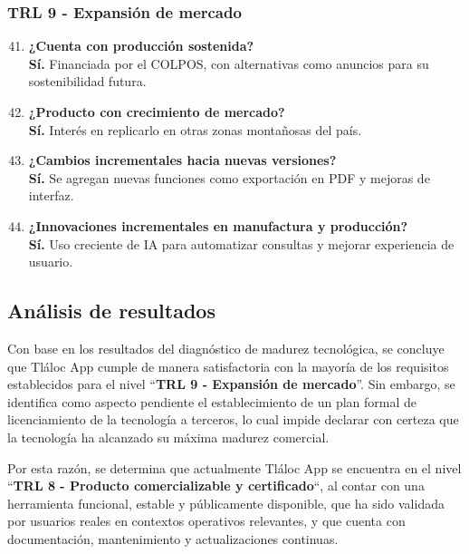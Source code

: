 \subsubsection*{TRL 9 - Expansión de mercado}
\begin{enumerate}
    \setcounter{enumi}{40}
    \item \textbf{¿Cuenta con producción sostenida?} \\ \textbf{Sí.} Financiada por el COLPOS, con alternativas como anuncios para su sostenibilidad futura.
    
    \item \textbf{¿Producto con crecimiento de mercado?} \\ \textbf{Sí.} Interés en replicarlo en otras zonas montañosas del país.
    
    \item \textbf{¿Cambios incrementales hacia nuevas versiones?} \\ \textbf{Sí.} Se agregan nuevas funciones como exportación en PDF y mejoras de interfaz.
    
    \item \textbf{¿Innovaciones incrementales en manufactura y producción?} \\ \textbf{Sí.} Uso creciente de IA para automatizar consultas y mejorar experiencia de usuario.
\end{enumerate}

\subsection{Análisis de resultados}

Con base en los resultados del diagnóstico de madurez tecnológica, se concluye que Tláloc App cumple de manera satisfactoria con la mayoría de los requisitos establecidos para el nivel ``\textbf{TRL 9 - Expansión de mercado}''. Sin embargo, se identifica como aspecto pendiente el establecimiento de un plan formal de licenciamiento de la tecnología a terceros, lo cual impide declarar con certeza que la tecnología ha alcanzado su máxima madurez comercial.

Por esta razón, se determina que actualmente Tláloc App se encuentra en el nivel ``\textbf{TRL 8 - Producto comercializable y certificado}``, al contar con una herramienta funcional, estable y públicamente disponible, que ha sido validada por usuarios reales en contextos operativos relevantes, y que cuenta con documentación, mantenimiento y actualizaciones continuas.






















